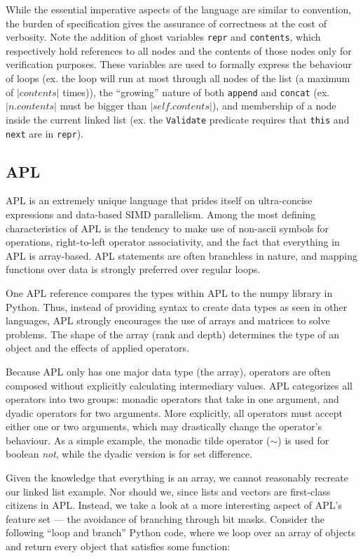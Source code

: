 \documentclass{article}
\begin{document}
While the essential imperative aspects of the language are similar to convention, the burden of specification
gives the assurance of correctness at the cost of verbosity.
Note the addition of ghost variables \texttt{repr} and \texttt{contents}, which respectively hold references to all nodes and the contents of those
nodes only for verification purposes. These variables are used to formally express the behaviour of
loops (ex. the loop will run at most through all nodes of the list (a maximum of $|contents|$ times)),
the ``growing'' nature of both \texttt{append} and \texttt{concat} (ex. $|n.contents|$ must be bigger than $|self.contents|$),
and membership of a node inside the current linked list
(ex. the \texttt{Validate} predicate requires that \texttt{this} and \texttt{next} are in \texttt{repr}).


\subsection{APL}

APL is an extremely unique language that prides itself on ultra-concise expressions and data-based SIMD parallelism.
Among the most defining characteristics of APL is the tendency to make use of non-ascii symbols for operations,
right-to-left operator associativity, and the fact that everything in APL is array-based. APL statements are often
branchless in nature, and mapping functions over data is strongly preferred over regular loops.

One APL reference \cite{apl} compares the types within APL to the numpy library in Python.
Thus, instead of providing syntax to create data types as seen in other languages,
APL strongly encourages the use of arrays and matrices to solve problems.
The shape of the array (rank and depth) determines the type of an object and the effects of applied operators.

Because APL only has one major data type (the array), operators are often composed without explicitly
calculating intermediary values. APL categorizes all operators into two groups: monadic operators that take
in one argument, and dyadic operators for two arguments. More explicitly, all operators must accept
either one or two arguments, which may drastically change the operator's behaviour.
As a simple example, the monadic tilde operator ($\sim$) is used for boolean \textit{not}, while the dyadic version
is for set difference.

Given the knowledge that everything is an array, we cannot reasonably recreate our linked list example. Nor should we,
since lists and vectors are first-class citizens in APL. Instead, we take a look at a more interesting aspect of APL's
feature set --- the avoidance of branching through bit masks. Consider the following ``loop and branch'' Python code,
where we loop over an array of objects and return every object that satisfies some function:
\inputminted{python}{linked_list/apl_example.py}
\end{document}
